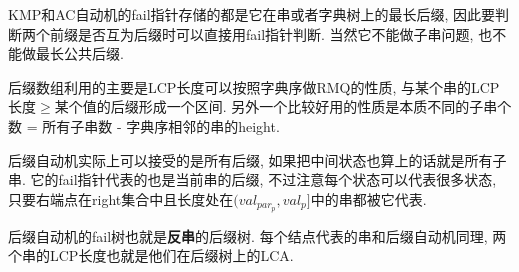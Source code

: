 KMP和AC自动机的fail指针存储的都是它在串或者字典树上的最长后缀, 因此要判断两个前缀是否互为后缀时可以直接用fail指针判断. 当然它不能做子串问题, 也不能做最长公共后缀.

后缀数组利用的主要是LCP长度可以按照字典序做RMQ的性质, 与某个串的LCP长度$\ge$某个值的后缀形成一个区间. 另外一个比较好用的性质是本质不同的子串个数 = 所有子串数 - 字典序相邻的串的height.

后缀自动机实际上可以接受的是所有后缀, 如果把中间状态也算上的话就是所有子串. 它的fail指针代表的也是当前串的后缀, 不过注意每个状态可以代表很多状态, 只要右端点在right集合中且长度处在$(val_{par_p}, val_p]$中的串都被它代表.

后缀自动机的fail树也就是\textbf{反串}的后缀树. 每个结点代表的串和后缀自动机同理, 两个串的LCP长度也就是他们在后缀树上的LCA.